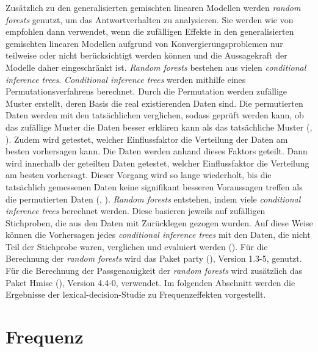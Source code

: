 Zusätzlich zu den generalisierten gemischten linearen Modellen werden \textit{random forests} genutzt, um das Antwortverhalten zu analysieren. Sie werden wie von \textcite[275]{Levshina.2015} empfohlen dann verwendet, wenn die zufälligen Effekte in den generalisierten gemischten linearen Modellen aufgrund von Konvergierungsproblemen nur teilweise oder nicht berücksichtigt werden können und die Aussagekraft der Modelle daher eingeschränkt ist. \textit{Random forests} bestehen aus vielen \textit{conditional inference trees}. \textit{Conditional inference trees} werden mithilfe eines Permutationsverfahrens berechnet. Durch die Permutation werden zufällige Muster erstellt, deren Basis die real existierenden Daten sind. Die permutierten Daten werden mit den tatsächlichen verglichen, sodass geprüft werden kann, ob das zufällige Muster die Daten besser erklären kann als das tatsächliche Muster (\cite[159]{Tagliamonte.2012}, \cite[291--292]{Levshina.2015}). Zudem wird getestet, welcher Einflussfaktor die Verteilung der Daten am besten vorhersagen kann. Die Daten werden anhand dieses Faktors geteilt. Dann wird innerhalb der geteilten Daten getestet, welcher Einflussfaktor die Verteilung am besten vorhersagt. Dieser Vorgang wird so lange wiederholt, bis die tatsächlich gemessenen Daten keine signifikant besseren Voraussagen treffen als die permutierten Daten (\cite[159]{Tagliamonte.2012}, \cite[291--292]{Levshina.2015}). \textit{Random forests} entstehen, indem viele \textit{conditional inference trees} berechnet werden. Diese basieren jeweils auf zufälligen Stichproben, die aus den Daten mit Zurücklegen gezogen wurden. Auf diese Weise können die Vorhersagen jedes \textit{conditional inference trees} mit den Daten, die nicht Teil der Stichprobe waren, verglichen und evaluiert werden (\cite[179--180]{Tagliamonte.2012}). Für die Berechnung der \textit{random forests} wird das Paket party (\cite{Hothorn.2006, Strobl.2008}), Version 1.3-5, genutzt. Für die Berechnung der Passgenauigkeit der \textit{random forests} wird zusätzlich das Paket Hmisc (\cite{Harrell.2019}), Version 4.4-0, verwendet. Im folgenden Abschnitt werden die Ergebnisse der lexical-decision-Studie zu Frequenzeffekten vorgestellt.

\section{Frequenz}
\label{freqerg}

